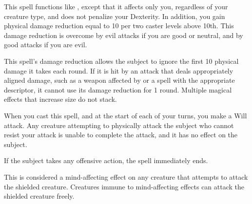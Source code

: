 \begin{spelleffect}
  This spell functions like , except that it affects only you, regardless of your creature type, and does not penalize your Dexterity. In addition, you gain physical damage reduction equal to 10  per two caster levels above 10th. This damage reduction is overcome by evil attacks if you are good or neutral, and by good attacks if you are evil.
\end{spelleffect}
\begin{spellnotes}
  This spell's damage reduction allows the subject to ignore the first 10 physical damage it takes each round. If it is hit by an attack that deals appropriately aligned damage, such as a weapon affected by  or a spell with the appropriate descriptor, it cannot use its damage reduction for 1 round.
  Multiple magical effects that increase size do not stack.
\end{spellnotes}

\spelldur{\durshort}
\begin{spelleffect}
    When you cast this spell, and at the start of each of your turns, you make a Will attack. Any creature attempting to physically attack the subject who cannot resist your attack is unable to complete the attack, and it has no effect on the subject.

If the subject takes any offensive action, the spell immediately ends.

\end{spelleffect}
\begin{spellnotes}
    This is considered a mind-affecting effect on any creature that attempts to attack the shielded creature. Creatures immune to mind-affecting effects can attack the shielded creature freely.
\end{spellnotes}

\begin{comment}
\subsubsection{S}
\end{comment}

